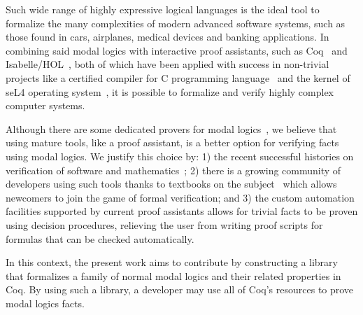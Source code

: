\documentclass[sigconf]{acmart}
\begin{document}
Such wide range of highly expressive logical languages is the ideal tool to 
formalize the many complexities of modern advanced software systems, 
such as those found in cars, airplanes, medical devices and banking applications.
In combining said modal logics with interactive proof assistants,
such as Coq~\cite{manual_coq} and Isabelle/HOL~\cite{manual_isabelle}, both of
which have been applied with success in non-trivial projects like a certified compiler 
for C programming language~\cite{Leroy09} and the kernel of seL4 operating
system~\cite{Klein10}, it is possible to formalize and verify highly complex computer
systems.

Although there are some dedicated provers for modal logics~\cite{Gleissner17,Mora11},
we believe that using mature tools, like a proof assistant, is a better option for
verifying facts using modal logics. We justify this choice by: 1) the recent
successful histories on verification of software and
mathematics~\cite{Leroy09,Klein10,Gonthier13,Gonthier08}; 2) there is a growing
community of developers using such tools thanks to 
textbooks on the subject~\cite{Nipkow14,Bertot10,Chlipala13} which allows
newcomers to join the game of formal verification; and 3) the custom automation
facilities supported by current proof assistants allows for trivial facts to
be proven using decision procedures, relieving the user from writing proof
scripts for formulas that can be checked automatically.

In this context, the present work aims to contribute by constructing a library
that formalizes a family of normal modal logics and their related properties in Coq.
By using such a library, a developer may use all of Coq's resources to prove
modal logics facts.



\end{document}
